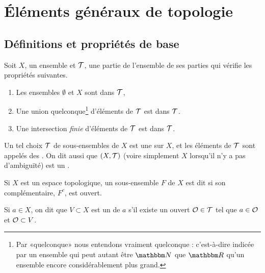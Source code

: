 
\section{Éléments généraux de topologie}

\subsection{Définitions et propriétés de base}

\begin{definition}		\label{DefTopologieGene}
Soit \( X \), un ensemble et \( \mathcal{T} \), une partie de l'ensemble de ses parties qui vérifie les propriétés suivantes.
\begin{enumerate}
\item
  Les ensembles \( \emptyset \) et \( X \) sont dans \( \mathcal{T} \),
\item
  Une union quelconque\footnote{Par «quelconque» nous entendons vraiment quelconque : c'est-à-dire indicée par un ensemble qui peut autant être \( \eN\) que \( \eR\) qu'un ensemble encore considérablement plus grand.} d'éléments de \( \mathcal{T}\) est dans \( \mathcal{T}\).
\item
  Une intersection \emph{finie} d'éléments de \( \mathcal{T}\) est dans \( \mathcal{T}\).
\end{enumerate}
Un tel choix \( \mathcal{T} \) de sous-ensembles de \( X \) est une   sur \( X \), et les éléments de \( \mathcal{T} \) sont appelés des . On dit aussi que \( (X,\mathcal{T}) \) (voire simplement \( X \) lorsqu'il n'y a pas d'ambiguïté) est un .
\end{definition}

\begin{definition}		\label{DefFermeVoisinage}
Si \(X \) est un espace topologique, un sous-ensemble \( F \) de \( X \) est dit  si son complémentaire, \( F^c \), est ouvert.

Si \(a \in X\), on dit que \(V \subset X\) est un  de \(a\) s'il existe un ouvert \(\mathcal{O} \in \mathcal{T}\) tel que \(a \in \mathcal{O}\) et \(\mathcal{O} \subset V\).
\end{definition}

